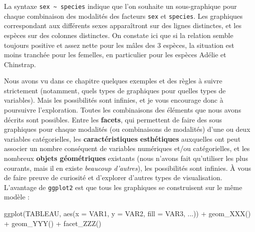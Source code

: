 \documentclass[
  a4paper,
  DIV=11,
  numbers=noendperiod,
  oneside]{scrreprt}
\newenvironment{Shaded}{}{}
\newcommand{\AttributeTok}[1]{\textcolor[rgb]{0.84,0.23,0.29}{#1}}
\newcommand{\FunctionTok}[1]{\textcolor[rgb]{0.44,0.26,0.76}{#1}}
\newcommand{\NormalTok}[1]{\textcolor[rgb]{0.14,0.16,0.18}{#1}}
\newcommand{\SpecialCharTok}[1]{\textcolor[rgb]{0.00,0.36,0.77}{#1}}
\begin{document}
La syntaxe \texttt{sex\ \textasciitilde{}\ species} indique que l'on
souhaite un sous-graphique pour chaque combinaison des modalités des
facteurs \texttt{sex} et \texttt{species}. Les graphiques correspondant
aux différents sexes apparaîtront sur des lignes distinctes, et les
espèces sur des colonnes distinctes. On constate ici que si la relation
semble toujours positive et assez nette pour les mâles des 3 espèces, la
situation est moins tranchée pour les femelles, en particulier pour les
espèces Adélie et Chinstrap.

Nous avons vu dans ce chapitre quelques exemples et des règles à suivre
strictement (notamment, quels types de graphiques pour quelles types de
variables). Mais les possibilités sont infinies, et je vous encourage
donc à poursuivre l'exploration. Toutes les combinaisons des éléments
que nous avons décrits sont possibles. Entre les \textbf{facets}, qui
permettent de faire des sous graphiques pour chaque modalités (ou
combinaisons de modalités) d'une ou deux variables catégorielles, les
\textbf{caractéristiques esthétiques} auxquelles ont peut associer un
nombre conséquent de variables numériques et/ou catégorielles, et les
nombreux \textbf{objets géométriques} existants (nous n'avons fait
qu'utiliser les plus courants, mais il en existe \emph{beaucoup
d'autres}), les possibilités sont infinies. À vous de faire preuve de
curiosité et d'explorer d'autres types de visualisation. L'avantage de
\texttt{ggplot2} est que tous les graphiques se construisent sur le même
modèle :

\begin{tcolorbox}[enhanced jigsaw, arc=.35mm, opacityback=0, colbacktitle=quarto-callout-important-color!10!white, bottomrule=.15mm, coltitle=black, colframe=quarto-callout-important-color-frame, breakable, toprule=.15mm, title=\textcolor{quarto-callout-important-color}{\faExclamation}\hspace{0.5em}{Important}, leftrule=.75mm, titlerule=0mm, bottomtitle=1mm, toptitle=1mm, left=2mm, rightrule=.15mm, opacitybacktitle=0.6, colback=white]

\begin{Shaded}
\begin{Highlighting}[]
\FunctionTok{ggplot}\NormalTok{(TABLEAU, }\FunctionTok{aes}\NormalTok{(}\AttributeTok{x =}\NormalTok{ VAR1, }\AttributeTok{y =}\NormalTok{ VAR2, }\AttributeTok{fill =}\NormalTok{ VAR3, ...)) }\SpecialCharTok{+}
  \FunctionTok{geom\_XXX}\NormalTok{() }\SpecialCharTok{+}
  \FunctionTok{geom\_YYY}\NormalTok{() }\SpecialCharTok{+}
  \FunctionTok{facet\_ZZZ}\NormalTok{()}
\end{Highlighting}
\end{Shaded}

\end{tcolorbox}
\end{document}
